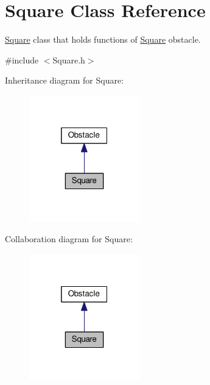 \hypertarget{classSquare}{}\section{Square Class Reference}
\label{classSquare}


\hyperlink{classSquare}{Square} class that holds functions of \hyperlink{classSquare}{Square} obstacle.  




{\ttfamily \#include $<$Square.\+h$>$}



Inheritance diagram for Square\+:
\nopagebreak
\begin{figure}[H]
\begin{center}
\leavevmode
\includegraphics[width=136pt]{classSquare__inherit__graph}
\end{center}
\end{figure}


Collaboration diagram for Square\+:
\nopagebreak
\begin{figure}[H]
\begin{center}
\leavevmode
\includegraphics[width=136pt]{classSquare__coll__graph}
\end{center}
\end{figure}
